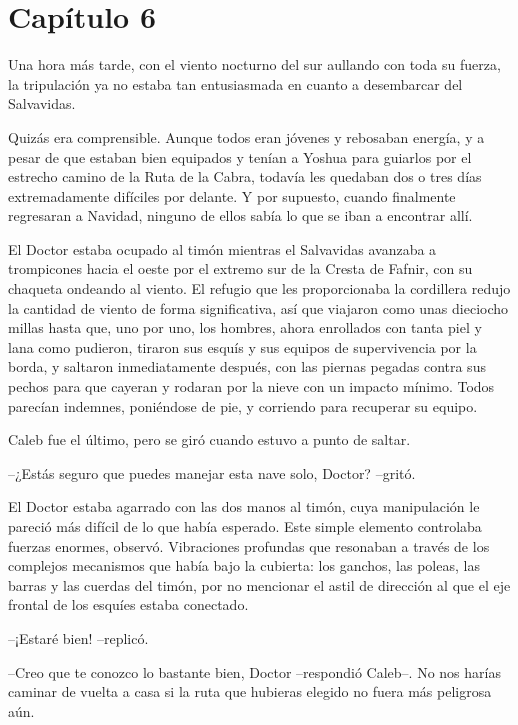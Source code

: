 \chapter*{Capítulo 6}

Una hora más tarde, con el viento nocturno del sur aullando con toda su fuerza, la tripulación ya no estaba tan entusiasmada en cuanto a desembarcar del Salvavidas.
 
Quizás era comprensible. Aunque todos eran jóvenes y rebosaban energía, y a pesar de que estaban bien equipados y tenían a Yoshua para guiarlos por el estrecho camino de la Ruta de la Cabra, todavía les quedaban dos o tres días extremadamente difíciles por delante. Y por supuesto, cuando finalmente regresaran a Navidad, ninguno de ellos sabía lo que se iban a encontrar allí.
 
El Doctor estaba ocupado al timón mientras el Salvavidas avanzaba a trompicones hacia el oeste por el extremo sur de la Cresta de Fafnir, con su chaqueta ondeando al viento. El refugio que les proporcionaba la cordillera redujo la cantidad de viento de forma significativa, así que viajaron como unas dieciocho millas hasta que, uno por uno, los hombres, ahora enrollados con tanta piel y lana como pudieron, tiraron sus esquís y sus equipos de supervivencia por la borda, y saltaron inmediatamente después, con las piernas pegadas contra sus pechos para que cayeran y rodaran por la nieve con un impacto mínimo. Todos parecían indemnes, poniéndose de pie, y corriendo para recuperar su equipo.
 
Caleb fue el último, pero se giró cuando estuvo a punto de saltar.
 
--¿Estás seguro que puedes manejar esta nave solo, Doctor? --gritó.
 
El Doctor estaba agarrado con las dos manos al timón, cuya manipulación le pareció más difícil de lo que había esperado. Este simple elemento controlaba fuerzas enormes, observó. Vibraciones profundas que resonaban a través de los complejos mecanismos que había bajo la cubierta: los ganchos, las poleas, las barras y las cuerdas del timón, por no mencionar el astil de dirección al que el eje frontal de los esquíes estaba conectado.
 
--¡Estaré bien! --replicó.
 
--Creo que te conozco lo bastante bien, Doctor --respondió Caleb--. No nos harías caminar de vuelta a casa si la ruta que hubieras elegido no fuera más peligrosa aún.
 
